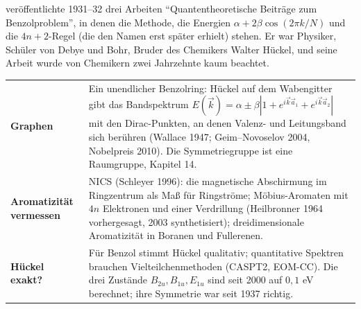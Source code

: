 \begin{geschichte}
 veröffentlichte 1931--32 drei Arbeiten \enquote{Quantentheoretische Beiträge zum Benzolproblem}, in denen die Methode, die Energien $\alpha + 2\beta\cos(2\pi k/N)$ und die $4n + 2$-Regel (die den Namen erst später erhielt) stehen. Er war Physiker, Schüler von Debye und Bohr, Bruder des Chemikers Walter Hückel, und seine Arbeit wurde von Chemikern zwei Jahrzehnte kaum beachtet.

\begin{center}
\begin{minipage}{0.9\textwidth}
\end{minipage}
\end{center}
\end{geschichte}

\begin{forschung}
\begin{center}
{\small
\renewcommand{\arraystretch}{1.45}
\begin{tabular}{@{}P{3.0cm}P{5.2cm}@{}}
\toprule
\textbf{Graphen} & Ein unendlicher Benzolring: Hückel auf dem Wabengitter gibt das Bandspektrum $E(\vec k) = \alpha\pm\beta|1 + e^{i\vec k\vec a_1} + e^{i\vec k\vec a_2}|$ mit den Dirac-Punkten, an denen Valenz- und Leitungsband sich berühren (Wallace 1947; Geim--Novoselov 2004, Nobelpreis 2010). Die Symmetriegruppe ist eine Raumgruppe, Kapitel 14.\\
\textbf{Aromatizität vermessen} & NICS (Schleyer 1996): die magnetische Abschirmung im Ringzentrum als Maß für Ringströme; Möbius-Aromaten mit $4n$ Elektronen und einer Verdrillung (Heilbronner 1964 vorhergesagt, 2003 synthetisiert); dreidimensionale Aromatizität in Boranen und Fullerenen.\\
\textbf{Hückel exakt?} & Für Benzol stimmt Hückel qualitativ; quantitative Spektren brauchen Vielteilchenmethoden (CASPT2, EOM-CC). Die drei Zustände $B_{2u}, B_{1u}, E_{1u}$ sind seit 2000 auf $0{,}1$ eV berechnet; ihre Symmetrie war seit 1937 richtig.\\
\bottomrule
\end{tabular}}
\end{center}
\end{forschung}

